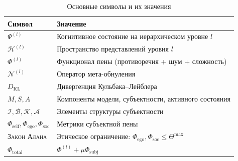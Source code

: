 \documentclass[11pt,a4paper]{article}
\theoremstyle{plain}
\theoremstyle{definition}
\theoremstyle{remark}
\newcommand{\PsiState}{\Psi}
\newcommand{\Foam}{\Phi}
\newcommand{\NullOp}{\mathcal{N}}
\newcommand{\Hilbert}{\mathcal{H}}
\newcommand{\KL}{D_{\mathrm{KL}}}
\newcommand{\Mmodel}{M}
\newcommand{\Ssubj}{S}
\newcommand{\Aactive}{A}
\newcommand{\Fself}{\Foam_{\mathrm{self}}}
\newcommand{\Fego}{\Foam_{\mathrm{ego}}}
\newcommand{\Fsoc}{\Foam_{\mathrm{soc}}}
\newcommand{\Fcog}{\Foam^{(l)}}
\newcommand{\Identity}{\mathcal{I}}
\newcommand{\Boundaries}{\mathcal{B}}
\newcommand{\Constants}{\mathcal{K}}
\newcommand{\Alliance}{\mathcal{A}}
\newcommand{\AlanLaw}{\textsc{Закон Алана}}
\begin{document}
\begin{table}[H]
\centering
\caption{Основные символы и их значения}
\begin{tabularx}{\linewidth}{@{}lX@{}}
\toprule
\textbf{Символ} & \textbf{Значение} \\
\midrule
$\PsiState^{(l)}$ & Когнитивное состояние на иерархическом уровне $l$ \\
$\Hilbert^{(l)}$ & Пространство представлений уровня $l$ \\
$\Foam^{(l)}$ & Функционал пены (противоречия + шум + сложность) \\
$\NullOp^{(l)}$ & Оператор мета-обнуления \\
$\KL$ & Дивергенция Кульбака–Лейблера \\
$\Mmodel, \Ssubj, \Aactive$ & Компоненты модели, субъектности, активного состояния \\
$\Identity, \Boundaries, \Constants, \Alliance$ & Элементы структуры субъектности \\
$\Fself, \Fego, \Fsoc$ & Метрики субъектной пены \\
\AlanLaw & Этическое ограничение: $\Fego, \Fsoc \leq \Theta^{\max}$ \\
$\Foam_{\mathrm{total}}$ & $\Fcog + \mu \Foam_{\mathrm{subj}}$ \\
\bottomrule
\end{tabularx}
\end{table}

\end{document}
